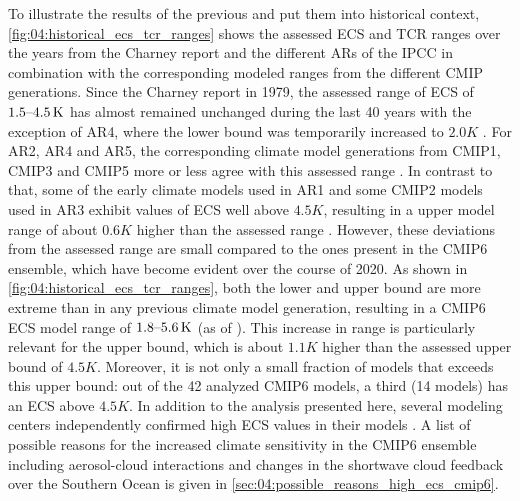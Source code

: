 To illustrate the results of the previous
 and put them into historical context,
\cref{fig:04:historical_ecs_tcr_ranges} shows the assessed \ac{ECS} and
\ac{TCR} ranges over the years from the Charney report \autocite{Charney1979}
and the different \acp{AR} of the \ac{IPCC} in combination with the
corresponding modeled ranges from the different \ac{CMIP} generations. Since
the Charney report in 1979, the assessed range of \ac{ECS} of
$\rangeunit{1.5}{4.5}{K}$ has almost remained unchanged during the last 40
years \autocite{Charney1979, Mitchell1990, Kattenberg1996, Albritton2001,
  Stocker2013} with the exception of \acs{AR}4, where the lower bound was
temporarily increased to $2.0 \unit{K}$ \autocite{Solomon2007}. For \acs{AR}2,
\acs{AR}4 and \acs{AR}5, the corresponding climate model generations from
\acs{CMIP}1, \acs{CMIP}3 and \acs{CMIP}5 more or less agree with this assessed
range \autocite{Kattenberg1996, Randall2007, Flato2013}. In contrast to that,
some of the early climate models used in \acs{AR}1 and some \acs{CMIP}2 models
used in \acs{AR}3 exhibit values of \acs{ECS} well above $4.5 \unit{K}$,
resulting in a upper model range of about $0.6 \unit{K}$ higher than the
assessed range \autocite{Mitchell1990, Cubasch2001}. However, these deviations
from the assessed range are small compared to the ones present in the
\acs{CMIP}6 ensemble, which have become evident over the course of 2020. As
shown in \cref{fig:04:historical_ecs_tcr_ranges}, both the lower and upper
bound are more extreme than in any previous climate model generation, resulting
in a \acs{CMIP}6 \ac{ECS} model range of $\rangeunit{1.8}{5.6}{K}$ (as of
\TheMonth{}). This increase in range is particularly relevant for the upper
bound, which is about $1.1 \unit{K}$ higher than the assessed upper bound of
$4.5 \unit{K}$. Moreover, it is not only a small fraction of models that
exceeds this upper bound: out of the 42 analyzed \acs{CMIP}6 models, a third
(14 models) has an \ac{ECS} above $4.5 \unit{K}$. In addition to the analysis
presented here, several modeling centers independently confirmed high \ac{ECS}
values in their models \autocite{Andrews2019, BodasSalcedo2019, Gettelman2019,
  Wyser2020}. A list of possible reasons for the increased climate sensitivity
in the \acs{CMIP}6 ensemble including aerosol-cloud interactions and changes in
the shortwave cloud feedback over the Southern Ocean is given in
\cref{sec:04:possible_reasons_high_ecs_cmip6}.

